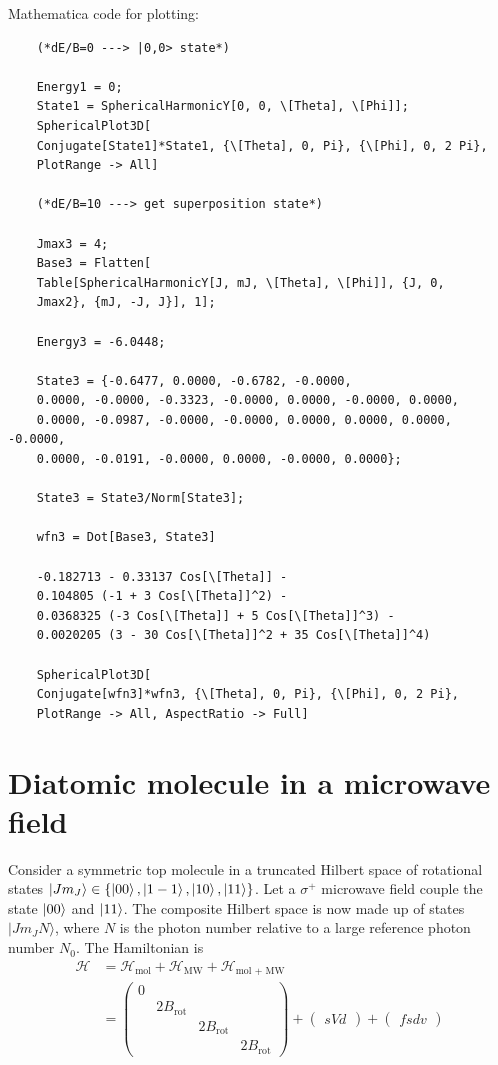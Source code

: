 \documentclass{article}
\theoremstyle{definition}
\newcommand{\nn}{\nonumber}
\newcommand{\ham}{\mathcal{H}}
\begin{document}
\noindent Mathematica code for plotting:
\begin{lstlisting}
	(*dE/B=0 ---> |0,0> state*)
	
	Energy1 = 0;
	State1 = SphericalHarmonicY[0, 0, \[Theta], \[Phi]];
	SphericalPlot3D[
	Conjugate[State1]*State1, {\[Theta], 0, Pi}, {\[Phi], 0, 2 Pi}, 
	PlotRange -> All]
		
	(*dE/B=10 ---> get superposition state*)
	
	Jmax3 = 4;
	Base3 = Flatten[
	Table[SphericalHarmonicY[J, mJ, \[Theta], \[Phi]], {J, 0, 
	Jmax2}, {mJ, -J, J}], 1];
	
	Energy3 = -6.0448;
	
	State3 = {-0.6477, 0.0000, -0.6782, -0.0000, 
	0.0000, -0.0000, -0.3323, -0.0000, 0.0000, -0.0000, 0.0000, 
	0.0000, -0.0987, -0.0000, -0.0000, 0.0000, 0.0000, 0.0000, -0.0000,
	0.0000, -0.0191, -0.0000, 0.0000, -0.0000, 0.0000};
	
	State3 = State3/Norm[State3];
	
	wfn3 = Dot[Base3, State3]
	
	-0.182713 - 0.33137 Cos[\[Theta]] - 
	0.104805 (-1 + 3 Cos[\[Theta]]^2) - 
	0.0368325 (-3 Cos[\[Theta]] + 5 Cos[\[Theta]]^3) - 
	0.0020205 (3 - 30 Cos[\[Theta]]^2 + 35 Cos[\[Theta]]^4)
	
	SphericalPlot3D[
	Conjugate[wfn3]*wfn3, {\[Theta], 0, Pi}, {\[Phi], 0, 2 Pi}, 
	PlotRange -> All, AspectRatio -> Full]
\end{lstlisting}



\section{Diatomic molecule in a microwave field}

Consider a symmetric top molecule in a truncated Hilbert space of rotational states $| J m_J \rangle \in \{  \ket{00}, \ket{1-1}, \ket{10}, \ket{11}  \}$. Let a $\sigma^+$ microwave field couple the state $\ket{00}$ and $\ket{11}$. The composite Hilbert space is now made up of states $| J m_J N\rangle$, where $N$ is the photon number relative to a large reference photon number $N_0$. The Hamiltonian is 
\begin{align}
\ham
&= \ham_\text{mol} + \ham_\text{MW} + \ham_\text{mol + MW} \nn \\
&= 
\begin{pmatrix}
0 &&&\\
& 2B_\text{rot}&& \\
&& 2B_\text{rot}& \\
&&& 2B_\text{rot} 
\end{pmatrix}
+ 
\begin{pmatrix}
sVd
\end{pmatrix}
+ 
\begin{pmatrix}
fsdv
\end{pmatrix}
\end{align}



 
	
\end{document}
